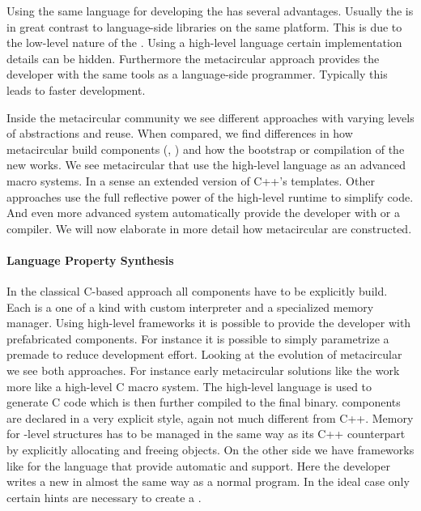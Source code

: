 \noindent Using the same language for developing the \VM has several advantages.
Usually the \VM is in great contrast to language-side libraries on the same platform.
This is due to the low-level nature of the \VM.
Using a high-level language certain implementation details can be hidden.
Furthermore the metacircular approach provides the \VM developer with the same tools as a language-side programmer.
Typically this leads to faster development.


Inside the metacircular \VM community we see different approaches with varying levels of abstractions and reuse.
When compared, we find differences in how metacircular \VMs build \VM components (\GC, \JIT) and how the bootstrap or compilation of the new \VM works.
We see metacircular \VMs that use the high-level language as an advanced macro systems.
In a sense an extended version of C++'s templates.
Other approaches use the full reflective power of the high-level runtime to simplify code.
And even more advanced system automatically provide the \VM developer with \GC or a \JIT compiler.
We will now elaborate in more detail how metacircular \VMs are constructed.


\paragraph{Language Property Synthesis}
In the classical C-based \VM approach all \VM components have to be explicitly build.
Each \VM is a one of a kind with custom interpreter and a specialized memory manager.
Using high-level \VM frameworks it is possible to provide the \VM developer with prefabricated components.
For instance it is possible to simply parametrize a premade \GC to reduce development effort.
Looking at the evolution of metacircular \VMs we see both approaches.
For instance early metacircular solutions like the \Squeak \VM \cite{Inga97a} work more like a high-level C macro system.
The high-level language is used to generate C code which is then further compiled to the final \VM binary.
\VM components are declared in a very explicit style, again not much different from C++.
Memory for \VM-level structures has to be managed in the same way as its C++ counterpart by explicitly allocating and freeing objects.
On the other side we have \VM frameworks like \PyPy for the \Python language that provide automatic \GC and \JIT support.
Here the developer writes a new \VM in almost the same way as a normal \Python program.
In the ideal case only certain hints are necessary to create a \JIT.

